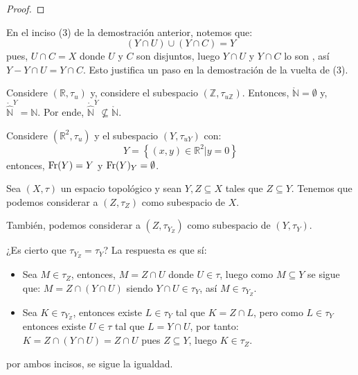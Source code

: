 \documentclass[12pt]{report}
\theoremstyle{largebreak}
\newcommand{\Int}[1]{\ensuremath{\mathring{#1}}}
\newcommand{\Fr}[1]{\ensuremath{\textup{Fr}(#1)}}
\begin{document}
\begin{proof}
    \end{proof}

    \begin{obs}
        En el inciso (3) de la demostración anterior, notemos que:
        \begin{equation*}
            (Y\cap U)\cup (Y\cap C)=Y
        \end{equation*}
        pues, $U\cap C = X$ donde $U$ y $C$ son disjuntos, luego $Y\cap U$ y $Y\cap C$ lo son , así $Y-Y\cap U=Y\cap C$. Esto justifica un paso en la demostración de la vuelta de (3).
    \end{obs}

    \begin{exa}
        Considere $(\mathbb{R},\tau_u)$ y, considere el subespacio $(\mathbb{Z},\tau_{u\mathbb{Z}})$. Entonces, $\Int{\mathbb{N}}=\emptyset$ y, $\Int{\widehat{\mathbb{N}}}^Y=\mathbb{N}$. Por ende, $\Int{\widehat{\mathbb{N}}}^Y\nsubseteq\Int{\mathbb{N}}$.
    \end{exa}

    \begin{exa}
        Considere $(\mathbb{R}^2,\tau_u)$ y el subespacio $(Y,\tau_{uY})$ con:
        \begin{equation*}
            Y=\left\{(x,y)\in\mathbb{R}^2\Big|y=0 \right\}
        \end{equation*}
        entonces, $\Fr{Y}=Y$ y $\Fr{Y}_Y=\emptyset$.
    \end{exa}

    \begin{obs}
        Sea $(X,\tau)$ un espacio topológico y sean $Y,Z\subseteq X$ tales que $Z\subseteq Y$. Tenemos que podemos considerar a $(Z,\tau_Z)$ como subespacio de $X$.

        También, podemos considerar a $(Z,\tau_{Y_Z})$ como subespacio de $(Y,\tau_Y)$.

        ¿Es cierto que $\tau_{Y_Z}=\tau_{Y}$? La respuesta es que sí:
        \begin{itemize}
            \item Sea $M\in\tau_Z$, entonces, $M=Z\cap U$ donde $U\in\tau$, luego como $M\subseteq Y$ se sigue que: $M=Z\cap(Y\cap U)$ siendo $Y\cap U\in\tau_Y$, así $M\in \tau_{Y_Z}$.
            \item Sea $K\in \tau_{Y_Z}$, entonces existe $L\in\tau_Y$ tal que $K=Z\cap L$, pero como $L\in\tau_Y$ entonces existe $U\in\tau$ tal que $L=Y\cap U$, por tanto: $K=Z\cap(Y\cap U)=Z\cap U$ pues $Z\subseteq Y$, luego $K\in\tau_Z$.
        \end{itemize}
        por ambos incisos, se sigue la igualdad.
    \end{obs}
\end{document}
